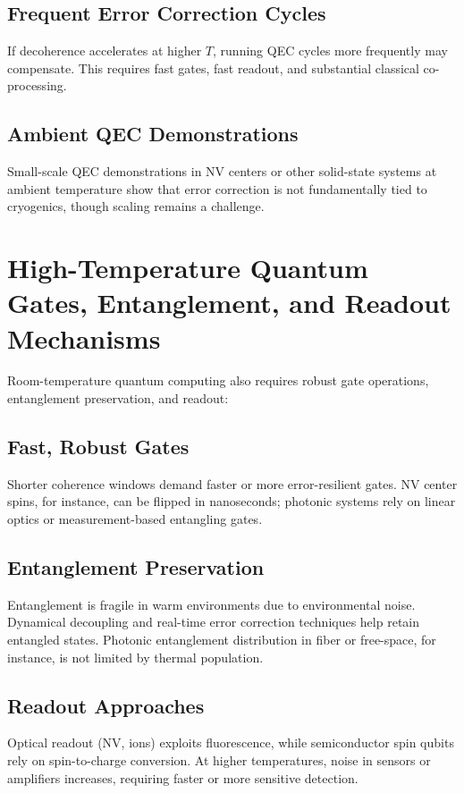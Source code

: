 \documentclass[11pt]{article}
\begin{document}
\subsection{Frequent Error Correction Cycles}
If decoherence accelerates at higher $T$, running QEC cycles more frequently may compensate. This requires fast gates, fast readout, and substantial classical co-processing.

\subsection{Ambient QEC Demonstrations}
Small-scale QEC demonstrations in NV centers or other solid-state systems at ambient temperature show that error correction is not fundamentally tied to cryogenics, though scaling remains a challenge.

\section{High-Temperature Quantum Gates, Entanglement, and Readout Mechanisms}

Room-temperature quantum computing also requires robust gate operations, entanglement preservation, and readout:

\subsection{Fast, Robust Gates}
Shorter coherence windows demand faster or more error-resilient gates. NV center spins, for instance, can be flipped in nanoseconds; photonic systems rely on linear optics or measurement-based entangling gates.

\subsection{Entanglement Preservation}
Entanglement is fragile in warm environments due to environmental noise. Dynamical decoupling and real-time error correction techniques help retain entangled states. Photonic entanglement distribution in fiber or free-space, for instance, is not limited by thermal population.

\subsection{Readout Approaches}
Optical readout (NV, ions) exploits fluorescence, while semiconductor spin qubits rely on spin-to-charge conversion. At higher temperatures, noise in sensors or amplifiers increases, requiring faster or more sensitive detection.
\end{document}
